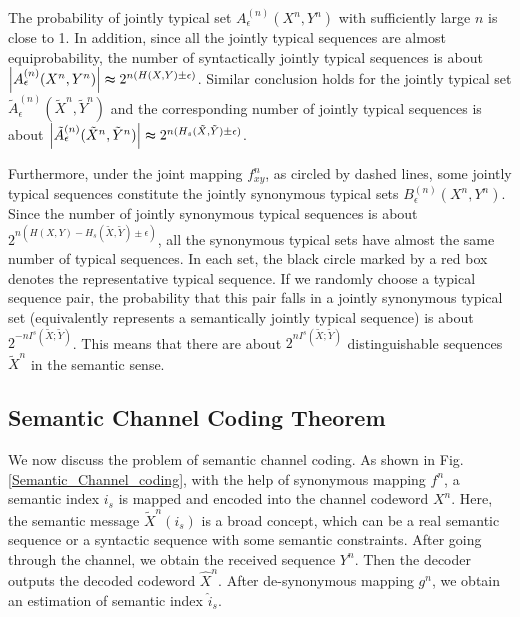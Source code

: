 \documentclass[12pt, draftclsnofoot,onecolumn]{IEEEtran}
\begin{document}
The probability of jointly typical set $A_{\epsilon}^{(n)}(X^n,Y^n)$ with sufficiently large $n$ is close to 1. In addition, since all the jointly typical sequences are almost equiprobability, the number of syntactically jointly typical sequences is about $\left|A_{\epsilon}^{(n)}(X^n,Y^n)\right|\thickapprox2^{n(H(X,Y)\pm\epsilon)}$.
Similar conclusion holds for the jointly typical set $\tilde{A}_{\epsilon}^{(n)}(\tilde{X}^n,\tilde{Y}^n)$ and the corresponding number of jointly typical sequences is about $\left|\tilde{A}_{\epsilon}^{(n)}(\tilde{X}^n,\tilde{Y}^n)\right|\thickapprox2^{n(H_s(\tilde{X},\tilde{Y})\pm\epsilon)}$.

Furthermore, under the joint mapping $f_{xy}^n$, as circled by dashed lines, some jointly typical sequences constitute the jointly synonymous typical sets $B_{\epsilon}^{(n)}(X^n,Y^n)$. Since the number of jointly synonymous typical sequences is about $2^{n(H(X,Y)-H_s(\tilde{X},\tilde{Y})\pm\epsilon)}$, all the synonymous typical sets have almost the same number of typical sequences. In each set, the black circle marked by a red box denotes the representative typical sequence. If we randomly choose a typical sequence pair, the probability that this pair falls in a jointly synonymous typical set (equivalently represents a semantically jointly typical sequence) is about $2^{-nI^s(\tilde{X};\tilde{Y})}$. This means that there are about $2^{nI^s(\tilde{X};\tilde{Y})}$ distinguishable sequences $\tilde{X}^n$ in the semantic sense.

\subsection{Semantic Channel Coding Theorem}
We now discuss the problem of semantic channel coding. As shown in Fig. \ref{Semantic_Channel_coding}, with the help of synonymous mapping $f^n$, a semantic index $i_s$ is mapped and encoded into the channel codeword $X^n$. Here, the semantic message $\tilde{X}^n(i_s)$ is a broad concept, which can be a real semantic sequence or a syntactic sequence with some semantic constraints. After going through the channel, we obtain the received sequence $Y^n$. Then the decoder outputs the decoded codeword $\hat{X}^n$. After de-synonymous mapping $g^n$, we obtain an estimation of semantic index $\hat{i}_s$.
\end{document}
